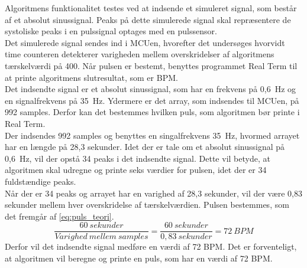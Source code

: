 Algoritmens funktionalitet testes ved at indsende et simuleret signal, som består af et absolut sinussignal. Peaks på dette simulerede signal skal repræsentere de systoliske peaks i en pulssignal optages med en pulssensor.\\
Det simulerede signal sendes ind i MCUen, hvorefter det undersøges hvorvidt time counteren detekterer varigheden mellem overskridelser af algoritmens tærskelværdi på 400. Når pulsen er bestemt, benyttes programmet Real Term til at printe algoritmens slutresultat, som er BPM. \\
Det indsendte signal er et absolut sinussignal, som har en frekvens på 0,6~Hz og en signalfrekvens på 35~Hz. Ydermere er det array, som indsendes til MCUen, på 992 samples. Derfor kan det bestemmes hvilken puls, som algoritmen bør printe i Real Term. \\
Der indsendes 992 samples og benyttes en singalfrekvens 35~Hz, hvormed arrayet har en længde på 28,3 sekunder. Idet der er tale om et absolut sinussignal på 0,6~Hz, vil der opstå 34 peaks i det indsendte signal. Dette vil betyde, at algoritmen skal udregne og printe seks værdier for pulsen, idet der er 34 fuldstændige peaks. \\
Når der er 34 peaks og arrayet har en varighed af 28,3 sekunder, vil der være 0,83 sekunder mellem hver overskridelse af tærskelværdien. Pulsen bestemmes, som det fremgår af \eqref{eq:puls_teori}.
\begin{equation}
\frac{60~sekunder}{Varighed~mellem~samples} = \frac{60~sekunder}{0,83~sekunder} = 72~BPM
\label{eq:puls_teori}
\end{equation} 
Derfor vil det indsendte signal medføre en værdi af 72 BPM. Det er forventeligt, at algoritmen vil beregne og printe en puls, som har en værdi af 72 BPM.

